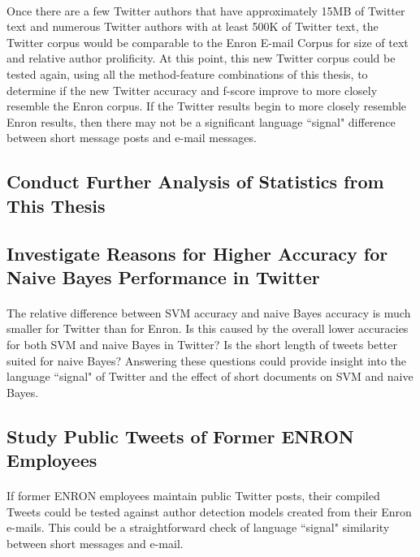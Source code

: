 		\paragraph*{} Once there are a few Twitter authors that have approximately 15MB of Twitter text and numerous Twitter authors with at least 500K of Twitter text, the Twitter corpus would be comparable to the Enron E-mail Corpus for size of text and relative author prolificity.  At this point, this new Twitter corpus could be tested again, using all the method-feature combinations of this thesis, to determine if the new Twitter accuracy and f-score improve to more closely resemble the Enron corpus.  If the Twitter results begin to more closely resemble Enron results, then there may not be a significant language ``signal" difference between short message posts and e-mail messages.

\begin{singlespace}
\section{Conduct Further Analysis of Statistics from This Thesis}
\end{singlespace}
	\begin{singlespace}
	\subsection{Investigate Reasons for Higher Accuracy for Naive Bayes Performance in Twitter}
	\end{singlespace}
	\paragraph*{} The relative difference between SVM accuracy and naive Bayes accuracy is much smaller for Twitter than for Enron.  Is this caused by the overall lower accuracies for both SVM and naive Bayes in Twitter?  Is the short length of tweets better suited for naive Bayes?  Answering these questions could provide insight into the language ``signal" of Twitter and the effect of short documents on SVM and naive Bayes.

	\subsection{Study Public Tweets of Former ENRON Employees}
	\paragraph*{} If former ENRON employees maintain public Twitter posts, their compiled Tweets could be tested against author detection models created from their Enron e-mails.  This could be a straightforward check of language ``signal" similarity between short messages and e-mail.
